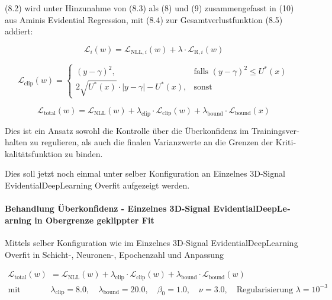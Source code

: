 \begin{otherlanguage}{ngerman}
\begin{minipage}{\linewidth}
\end{minipage}

(8.2) wird unter Hinzunahme von (8.3) als (8) und (9) zusammengefasst in (10) aus Aminis Evidential Regression, mit (8.4) zur Gesamtverlustfunktion (8.5) addiert: 

\begin{equation}
\mathcal{L}_i(w) = \mathcal{L}_{\text{NLL},i}(w) + \lambda \cdot \mathcal{L}_{\text{R},i}(w)
\label{eq:evidential_loss}
\end{equation}

\begin{equation}
\mathcal{L}_{\text{clip}}(w) =
\begin{cases}
(y - \gamma)^2, & \text{falls } (y - \gamma)^2 \leq U^*(x) \\
2 \sqrt{U^*(x)} \cdot |y - \gamma| - U^*(x), & \text{sonst}
\end{cases}
\end{equation}

\begin{equation}
\mathcal{L}_{\text{total}}(w) = \mathcal{L}_{\text{NLL}}(w) + \lambda_{\text{clip}} \cdot \mathcal{L}_{\text{clip}}(w) + \lambda_{\text{bound}} \cdot \mathcal{L}_{\text{bound}}(x)
\end{equation}

Dies ist ein Ansatz sowohl die Kontrolle über die Überkonfidenz im Trainingsverhalten zu regulieren, als auch die finalen Varianzwerte an die Grenzen der Kritikalitätsfunktion zu binden.

Dies soll jetzt noch einmal unter selber Konfiguration an \glqq{}Einzelnes 3D-Signal \gls{EvidentialDeepLearning} Overfit\grqq{} aufgezeigt werden.



\paragraph{Behandlung Überkonfidenz - \glqq{}Einzelnes 3D-Signal \gls{EvidentialDeepLearning} in Obergrenze geklippter Fit\grqq{}}

Mittels selber Konfiguration wie im \glqq{}Einzelnes 3D-Signal \gls{EvidentialDeepLearning} Overfit\grqq{} in Schicht-, Neuronen-, Epochenzahl und Anpassung 

\begin{align*}
\mathcal{L}_{\text{total}}(w) &= 
\mathcal{L}_{\text{NLL}}(w) 
+ \lambda_{\text{clip}} \cdot \mathcal{L}_{\text{clip}}(w) 
+ \lambda_{\text{bound}} \cdot \mathcal{L}_{\text{bound}}(w)
\\
\text{mit} \quad 
&\lambda_{\text{clip}} = 8.0, \quad 
\lambda_{\text{bound}} = 20.0, \quad 
\beta_0 = 1.0, \quad 
\nu = 3.0, \quad 
\text{Regularisierung } \lambda = 10^{-3}
\end{align*}


\end{otherlanguage}
